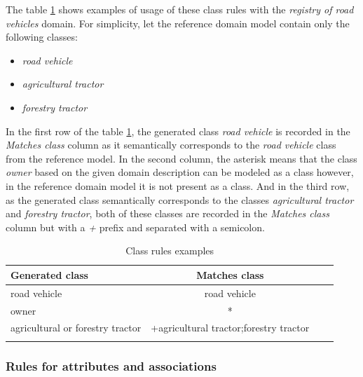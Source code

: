 The table \ref{tab:class-rules} shows examples of usage of these class rules with the \textit{registry of road vehicles} domain. For simplicity, let the reference domain model contain only the following classes:

\begin{itemize}
\item \textit{road vehicle}
\item \textit{agricultural tractor}
\item \textit{forestry tractor}
\end{itemize}

\noindent{}In the first row of the table \ref{tab:class-rules}, the generated class \textit{road vehicle} is recorded in the \textit{Matches class} column as it semantically corresponds to the \textit{road vehicle} class from the reference model. In the second column, the asterisk means that the class \textit{owner} based on the given domain description can be modeled as a class however, in the reference domain model it is not present as a class. And in the third row, as the generated class semantically corresponds to the classes \textit{agricultural tractor} and \textit{forestry tractor}, both of these classes are recorded in the \textit{Matches class} column but with a \textit{+} prefix and separated with a semicolon.

\begin{table}[!h]
    \scriptsize
    \centering
    \setlength{\tabcolsep}{0.5em}
    \begin{tabular}{lccc}
     \toprule
         Generated class & Matches class \\
    \toprule
    
\addlinespace
road vehicle   & road vehicle \\
\addlinespace
owner         & * \\
\addlinespace
agricultural or forestry tractor & +agricultural tractor;forestry tractor \\
    \addlinespace
    \bottomrule
    \addlinespace
    \end{tabular}
    \caption{Class rules examples}
    \label{tab:class-rules}
\end{table}



\subsubsection{Rules for attributes and associations}

